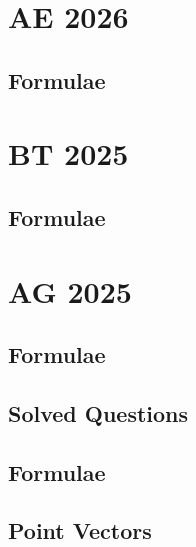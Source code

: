 \documentclass[journal]{IEEEtran}
\begin{document}
\newpage


\tableofcontents

\newpage
\onecolumn


\renewcommand{\thetable}{\theenumi}
\renewcommand{\thesubsection}{\thesection.\arabic{subsection}}


%
\section{AE 2026}
\subsection{Formulae}

\section{BT 2025}
\subsection{Formulae}


\section{AG 2025}
\subsection{Formulae}

\subsection{Solved Questions}

\iffalse
\subsection{Formulae}

\subsection{Point Vectors}

\end{document}
